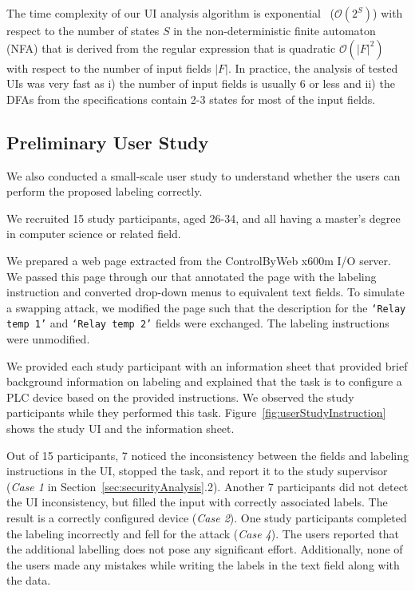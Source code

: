 The time complexity of our UI analysis algorithm is exponential~\cite{Salomaa1997} ($\mathcal{O}(2^S)$) with respect to the number of states $S$ in the non-deterministic finite automaton (NFA) that is derived from the regular expression that is quadratic $\mathcal{O}(|F|^2)$ with respect to the number of input fields $|F|$. In practice, the analysis of tested UIs was very fast as i) the number of input fields is usually $6$ or less and ii) the DFAs from the specifications contain 2-3 states for most of the input fields.



\subsection{Preliminary User Study}
\label{sec:results:userStudy}

We also conducted a small-scale user study to understand whether the users can perform the proposed labeling correctly. 

 We recruited 15 study participants, aged 26-34, and all having a master's degree in computer science or related field.

 We prepared a web page extracted from the ControlByWeb x600m I/O server. We passed this page through our \tool that annotated the page with the labeling instruction and converted drop-down menus to equivalent text fields. To simulate a swapping attack, we modified the page such that the description for the \texttt{`Relay temp 1'} and \texttt{`Relay temp 2'} fields were exchanged. The labeling instructions were unmodified.

We provided each study participant with an information sheet that provided brief background information on labeling and explained that the task is to configure a PLC device based on the provided instructions. We observed the study participants while they performed this task. %
Figure~\ref{fig:userStudyInstruction} shows the study UI and the information sheet.

 Out of 15 participants, 7 noticed the inconsistency between the fields and labeling instructions in the UI, stopped the task, and report it to the study supervisor (\emph{Case 1} in Section~\ref{sec:securityAnalysis}.2). Another 7 participants did not detect the UI inconsistency, but filled the input with correctly associated labels. The result is a correctly configured device (\emph{Case 2}). One study participants completed the labeling incorrectly and fell for the attack (\emph{Case 4}). The users reported that the additional labelling does not pose any significant effort. Additionally, none of the users made any mistakes while writing the labels in the text field along with the data. 

